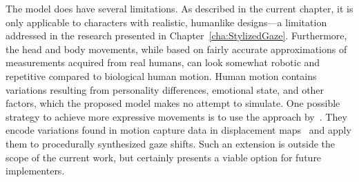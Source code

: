 The model does have several limitations. As described in the current chapter, it is only applicable to characters with realistic, humanlike designs---a limitation addressed in the research presented in Chapter~\ref{cha:StylizedGaze}. Furthermore, the head and body movements, while based on fairly accurate approximations of measurements acquired from real humans, can look somewhat robotic and repetitive compared to biological human motion. Human motion contains variations resulting from personality differences, emotional state, and other factors, which the proposed model makes no attempt to simulate. One possible strategy to achieve more expressive movements is to use the approach by~\citet{lance2010expressive}. They encode variations found in motion capture data in displacement maps~\citep{witkin1995motion} and apply them to procedurally synthesized gaze shifts. Such an extension is outside the scope of the current work, but certainly presents a viable option for future implementers. 